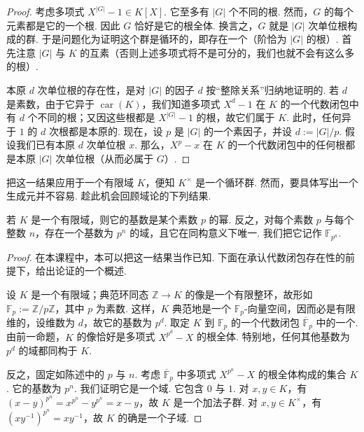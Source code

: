 \begin{proof}
考虑多项式 $X^{|G|}-1\in K[X]$. 它至多有 $|G|$ 个不同的根. 然而，$G$ 的每个元素都是它的一个根. 因此 $G$ 恰好是它的根全体. 换言之，$G$ 就是 $|G|$ 次单位根构成的群. 于是问题化为证明这个群是循环的，即存在一个（阶恰为 $|G|$ 的根）. 首先注意 $|G|$ 与 $K$ 的互素（否则上述多项式将不是可分的，我们也就不会有这么多的根）.

本原 $d$ 次单位根的存在性，是对 $|G|$ 的因子 $d$ 按``整除关系''归纳地证明的. 若 $d$ 是素数，由于它异于 $\operatorname{car}(K)$，我们知道多项式 $X^d-1$ 在 $K$ 的一个代数闭包中有 $d$ 个不同的根；又因这些根都是 $X^{|G|}-1$ 的根，故它们属于 $K$. 此时，任何异于 $1$ 的 $d$ 次根都是本原的. 现在，设 $p$ 是 $|G|$ 的一个素因子，并设 $d:=|G|/p$. 假设我们已有本原 $d$ 次单位根 $x$. 那么，$X^p-x$ 在 $K$ 的一个代数闭包中的任何根都是本原 $|G|$ 次单位根（从而必属于 $G$）.
\end{proof}

把这一结果应用于一个有限域 $K$，便知 $K^\times$ 是一个循环群. 然而，要具体写出一个生成元并不容易. 趁此机会回顾域论的下列结果.

\begin{theorem}\label{thm:fg-1-2-3}
若 $K$ 是一个有限域，则它的基数是某个素数 $p$ 的幂. 反之，对每个素数 $p$ 与每个整数 $n$，存在一个基数为 $p^n$ 的域，且它在同构意义下唯一. 我们把它记作 $\mathbb{F}_{p^n}$.
\end{theorem}

\begin{proof}
在本课程中，本可以把这一结果当作已知. 下面在承认代数闭包存在性的前提下，给出论证的一个概述.

设 $K$ 是一个有限域；典范环同态 $\mathbb{Z}\longrightarrow K$ 的像是一个有限整环，故形如 $\mathbb{F}_p:=\mathbb{Z}/p\mathbb{Z}$，其中 $p$ 为素数. 这样，$K$ 典范地是一个 $\mathbb{F}_p$-向量空间，因而必是有限维的，设维数为 $d$，故它的基数为 $p^d$. 取定 $K$ 到 $\mathbb{F}_p$ 的一个代数闭包 $\overline{\mathbb{F}}_p$ 中的一个. 由前一命题，$K$ 的像恰好是多项式 $X^{p^d}-X$ 的根全体. 特别地，任何其他基数为 $p^d$ 的域都同构于 $K$.

反之，固定如陈述中的 $p$ 与 $n$. 考虑 $\overline{\mathbb{F}}_p$ 中多项式 $X^{p^n}-X$ 的根全体构成的集合 $K$. 它的基数为 $p^n$. 我们证明它是一个域. 它包含 $0$ 与 $1$. 对 $x,y\in K$，有 $(x-y)^{p^n}=x^{p^n}-y^{p^n}=x-y$，故 $K$ 是一个加法子群. 对 $x,y\in K^\times$，有 $(xy^{-1})^{p^n}=xy^{-1}$，故 $K$ 的确是一个子域.
\end{proof}

